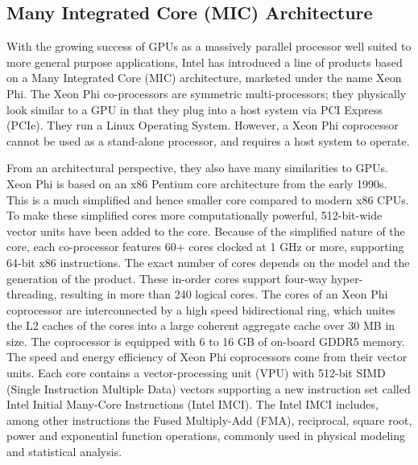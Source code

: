 \subsection{Many Integrated Core (MIC) Architecture}
With the growing success of GPUs as a massively parallel processor well suited to more general purpose applications, Intel has introduced a line of products based on a Many Integrated Core (MIC) architecture, marketed under the name Xeon Phi. The Xeon Phi co-processors are symmetric multi-processors; they physically look similar to a GPU in that they plug into a host system via PCI Express (PCIe). They run a Linux Operating System. However, a Xeon Phi coprocessor cannot be used as a stand-alone processor, and requires a host system to operate.
  
From an architectural perspective, they also have many similarities to GPUs. Xeon Phi is based on an x86 Pentium core architecture from the early 1990s. This is a much simplified and hence smaller core compared to modern x86 CPUs. To make these simplified cores more computationally powerful, 512-bit-wide vector units have been added to the core. Because of the simplified nature of the core, each co-processor features 60+ cores clocked at 1 GHz or more, supporting 64-bit x86 instructions. The exact number of cores depends on the model and the generation of the product. These in-order cores support four-way hyper-threading, resulting in more than 240 logical cores. The cores of an Xeon Phi coprocessor are interconnected by a high speed bidirectional ring, which unites the L2 caches of the cores into a large coherent aggregate cache over 30 MB in size. The coprocessor is equipped with 6 to 16 GB of on-board GDDR5 memory. The speed and energy efficiency of Xeon Phi coprocessors come from their vector units. Each core contains a vector-processing unit (VPU) with 512-bit SIMD (Single Instruction Multiple Data) vectors supporting a new instruction set called Intel Initial Many-Core Instructions (Intel IMCI). The Intel IMCI includes, among other instructions the Fused Multiply-Add (FMA), reciprocal, square root, power and exponential function operations, commonly used in physical modeling and statistical analysis\cite{R:22}.
  
